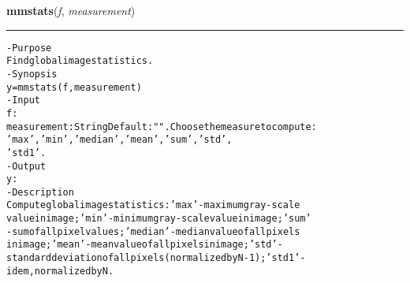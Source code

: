     \begin{boxedminipage}{\textwidth}

    \raggedright \textbf{mmstats}(\textit{f}, \textit{measurement})

    \vspace{-1.5ex}

    \rule{\textwidth}{0.5\fboxrule}
\begin{alltt}
- Purpose
    Find global image statistics.
- Synopsis
    y = mmstats(f, measurement)
- Input
    f:           
    measurement: String Default: "". Choose the measure to compute:
                 'max', 'min', 'median', 'mean', 'sum', 'std',
                 'std1'.
- Output
    y:
- Description
    Compute global image statistics: 'max' - maximum gray-scale
    value in image; 'min' - minimum gray-scale value in image; 'sum'
    - sum of all pixel values; 'median' - median value of all pixels
    in image; 'mean' - mean value of all pixels in image; 'std' -
    standard deviation of all pixels (normalized by N-1); 'std1' -
    idem, normalized by N.\end{alltt}

    \vspace{1ex}

    \end{boxedminipage}

    \label{multireg:num_pymorph:mmsubm}
    \vspace{0.5ex}


